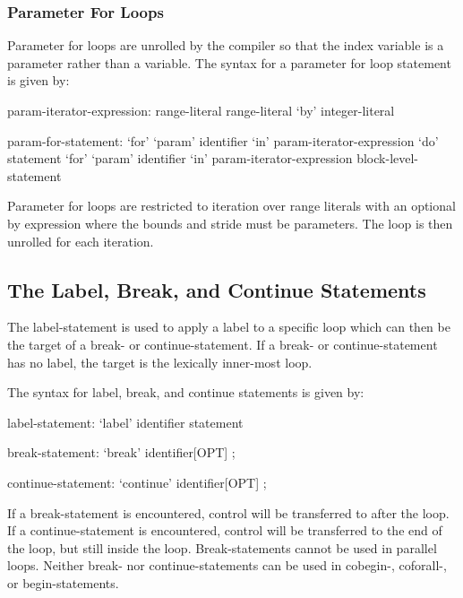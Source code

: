 \subsubsection{Parameter For Loops}
\label{Parameter_For_Loops}


Parameter for loops are unrolled by the compiler so that the index
variable is a parameter rather than a variable.  The syntax for a
parameter for loop statement is given by:
\begin{syntax}
param-iterator-expression:
  range-literal
  range-literal `by' integer-literal

param-for-statement:
  `for' `param' identifier `in' param-iterator-expression `do' statement
  `for' `param' identifier `in' param-iterator-expression block-level-statement
\end{syntax}
Parameter for loops are restricted to iteration over range literals
with an optional by expression where the bounds and stride must be
parameters.  The loop is then unrolled for each iteration.

\subsection{The Label, Break, and Continue Statements}
\label{Label_Break_Continue}

The label-statement is used to apply a label to a specific loop which
can then be the target of a break- or continue-statement.  If a break-
or continue-statement has no label, the target is the lexically
inner-most loop.

The syntax for label, break, and continue statements is given by:
\begin{syntax}
label-statement:
  `label' identifier statement

break-statement:
  `break' identifier[OPT] ;

continue-statement:
  `continue' identifier[OPT] ;
\end{syntax}

If a break-statement is encountered, control will be transferred to
after the loop.  If a continue-statement is encountered, control will
be transferred to the end of the loop, but still inside the loop.
Break-statements cannot be used in parallel loops.  Neither break- nor
continue-statements can be used in cobegin-, coforall-, or
begin-statements.

